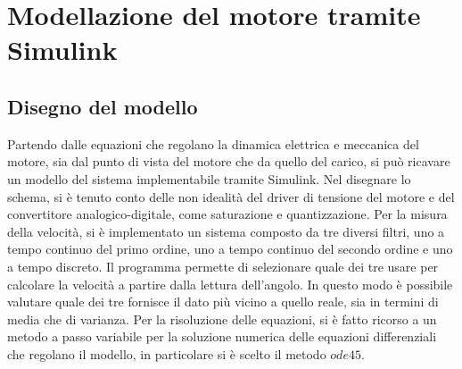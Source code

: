 \documentclass[a4paper, 11pt]{article}
\begin{document}
\section{Modellazione del motore tramite Simulink}
\subsection{Disegno del modello}
Partendo dalle equazioni che regolano la dinamica elettrica e meccanica del motore, sia dal punto di vista del motore che da quello del carico, si può ricavare un modello del sistema implementabile tramite Simulink. Nel disegnare lo schema, si è tenuto conto delle non idealità del driver di tensione del motore e del convertitore analogico-digitale, come saturazione e quantizzazione. Per la misura della velocità, si è implementato un sistema composto da tre diversi filtri, uno a tempo continuo del primo ordine, uno a tempo continuo del secondo ordine e uno a tempo discreto. Il programma permette di selezionare quale dei tre usare per calcolare la velocità a partire dalla lettura dell'angolo. In questo modo è possibile valutare quale dei tre fornisce il dato più vicino a quello reale, sia in termini di media che di varianza. Per la risoluzione delle equazioni, si è fatto ricorso a un metodo a passo variabile per la soluzione numerica delle equazioni differenziali che regolano il modello, in particolare si è scelto il metodo $ode45$.
\end{document}
